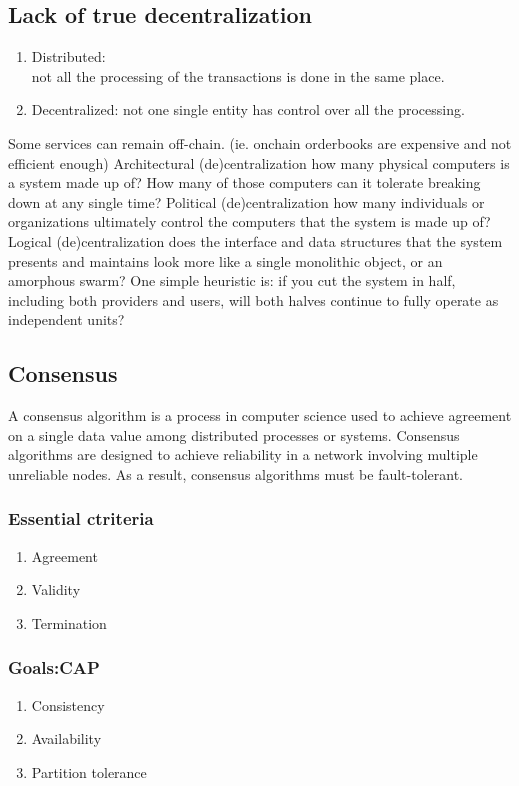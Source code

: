 \documentclass[]{article}
\begin{document}
	\subsection{Lack of true decentralization}
	\begin{enumerate}
	\item Distributed:\\ not all the processing of the transactions is done in the same place. 
	\item Decentralized: not one single entity has control over all the processing.
	\end{enumerate}
	Some services can remain off-chain. 
	(ie. onchain orderbooks are expensive and not efficient enough)
	Architectural (de)centralization how many physical computers is a system made up of? How many of those computers can it tolerate breaking down at any single time?
	Political (de)centralization how many individuals or organizations ultimately control the computers that the system is made up of?
	Logical (de)centralization does the interface and data structures that the system presents and maintains look more like a single monolithic object, or an amorphous swarm? One simple heuristic is: if you cut the system in half, including both providers and users, will both halves continue to fully operate as independent units?
	

	\subsection{Consensus}
	 A consensus algorithm is a process in computer science used to achieve agreement on a single data value among distributed processes or systems. Consensus algorithms are designed to achieve reliability in a network involving multiple unreliable nodes. As a result, consensus algorithms must be fault-tolerant.
	\subsubsection{Essential ctriteria}
	\begin{enumerate} 
	\item Agreement
	\item Validity 
	\item Termination
	\end{enumerate}
	\subsubsection{Goals:CAP}
	\begin{enumerate}  
	\item Consistency
	\item Availability	
	\item Partition tolerance
	\end{enumerate}
\end{document}
